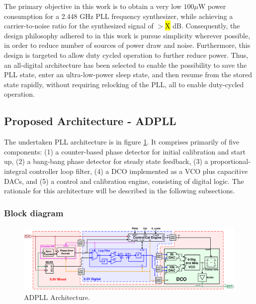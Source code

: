 
The primary objective in this work is to obtain a very low $100\mu$W power consumption for a 2.448 GHz PLL frequency synthesizer, while achieving a carrier-to-noise ratio for the synthesized signal of $>$\hl{X} dB. Consequently, the design philosophy adhered to in this work is pursue simplicity wherever possible, in order to reduce number of sources of power draw and noise. Furthermore, this design is targeted to allow duty cycled operation to further reduce power. Thus, an all-digital architecture has been selected to enable the possibility to save the PLL state, enter an ultra-low-power sleep state, and then resume from the stored state rapidly, without requiring relocking of the PLL, all to enable duty-cycled operation. 

\subsection{Proposed Architecture - ADPLL}\label{pll_arch}
	The undertaken PLL architecture is in figure \ref{fig:pll_arch}. It comprises primarily of five components: (1) a counter-based phase detector for initial calibration and start up, (2) a bang-bang phase detector for steady state feedback, (3) a proportional-integral controller loop filter, (4) a DCO implemented as a VCO plus capacitive DACs, and (5) a control and calibration engine, consisting of digital logic. The rationale for this architecture will be described in the following subsections.
	\subsubsection{Block diagram}
			\begin{figure}[htb!]
		        \centering
		        \includegraphics[width=1\textwidth, angle=0]{./figs/design/pll_master_arch_final}
			    \caption{ADPLL Architecture.}
			    \label{fig:pll_arch}
			\end{figure}

